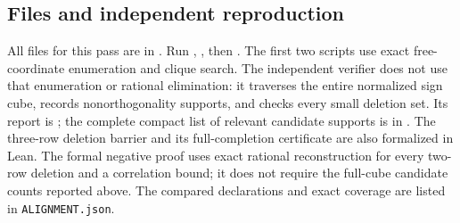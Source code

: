\subsection{Files and independent reproduction}
All files for this pass are in .
Run , , then .
The first two scripts use exact free-coordinate enumeration and clique
search. The independent verifier does not use that enumeration or
rational elimination: it traverses the entire normalized sign cube,
records nonorthogonality supports, and checks every small deletion set.
Its report is ; the complete compact list of
relevant candidate supports is in .
The three-row deletion barrier and its full-completion certificate are
also formalized in Lean. The formal negative proof uses exact rational
reconstruction for every two-row deletion and a correlation bound;
it does not require the full-cube candidate counts reported above.
The compared declarations and exact coverage are listed in
\texttt{ALIGNMENT.json}.
